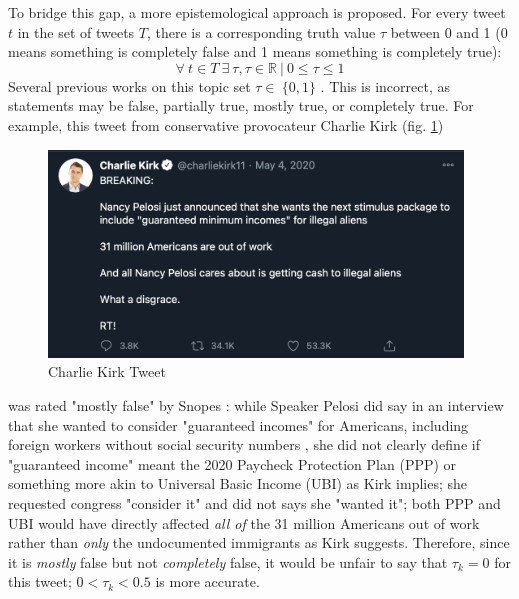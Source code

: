 \documentclass[preprint,review,12pt]{elsarticle}
\begin{document}
To bridge this gap, a more epistemological approach is proposed. For every tweet $t$ in the set of tweets $T$, there is a corresponding truth value $\tau$ between 0 and 1 (0 means something is completely false and 1 means something is completely true):
\begin{equation}
\label{truthvalues}
    \forall \ t \in T \ \exists \ \tau, \tau \in \mathbb{R} \ | \ 0 \leq \tau \leq 1
\end{equation}
Several previous works on this topic set $\tau \in \ \{0,1\}$ \cite{liu2018early,shu2017fake}. This is incorrect, as statements may be false, partially true, mostly true, or completely true. For example, this tweet from conservative provocateur Charlie Kirk (fig. \ref{fig:Charlie Kirk Tweet, May 4, 2020})  \begin{figure}[h]
    \centering
    \includegraphics[width=11cm]{CharlieKirk Tweet.png}
    \caption{Charlie Kirk Tweet \cite{kirk2020tweet}}
    \label{fig:Charlie Kirk Tweet, May 4, 2020}
\end{figure} was rated "mostly false" by Snopes \cite{lee2020pelosi}: while Speaker Pelosi did say in an interview that she wanted to consider "guaranteed incomes" for Americans, including foreign workers without social security numbers \cite{pelosi2020maher}, she did not clearly define if "guaranteed income" meant the 2020 Paycheck Protection Plan (PPP) or something more akin to Universal Basic Income (UBI) as Kirk implies; she requested congress "consider it" and did not says she "wanted it"; both PPP and UBI would have directly affected \textit{all of} the 31 million Americans out of work rather than \textit{only} the undocumented immigrants as Kirk suggests. Therefore, since it is \textit{mostly} false but not \textit{completely} false, it would be unfair to say that $\tau_k = 0$ for this tweet; $ 0 < \tau_k < 0.5$ is more accurate. 
\end{document}
